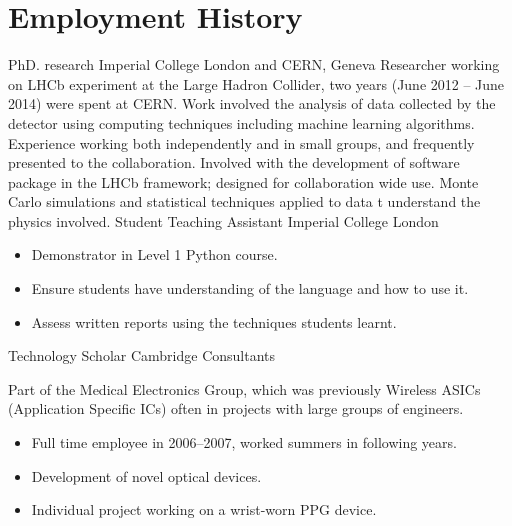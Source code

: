 \section{Employment History}
{PhD. research}
{Imperial College London and CERN, Geneva}
{}{}
{
  Researcher working on LHCb experiment at the Large Hadron Collider, two years (June 2012 -- June
  2014) were spent at CERN.
  Work involved the analysis of data collected by the detector using computing techniques including
  machine learning algorithms.
  Experience working both independently and in small groups, and frequently presented to the
  collaboration.
  Involved with the development of software package in the LHCb framework; designed for
  collaboration wide use.
  Monte Carlo simulations and statistical techniques applied to data t understand the physics
  involved.
}
{Student Teaching Assistant}
{Imperial College London}
{}{}
{
  \begin{itemize}
    \item Demonstrator in Level 1 Python course.
    \item Ensure students have understanding of the language and how to use it.
    \item Assess written reports using the techniques students learnt.
  \end{itemize}
}
{Technology Scholar}
{Cambridge Consultants}
{}{}
{
  Part of the Medical Electronics Group, which was previously Wireless ASICs (Application
  Specific ICs) often in projects with large groups of engineers.
  \begin{itemize}
    \item Full time employee in 2006--2007, worked summers in following years.
    \item Development of novel optical devices.
    \item Individual project working on a wrist-worn PPG device.
  \end{itemize}
}


